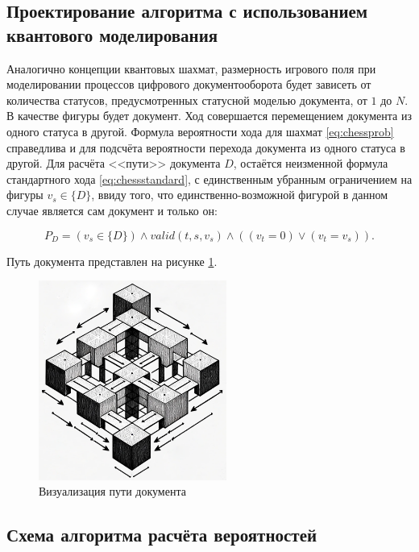 \subsection{Проектирование алгоритма с использованием квантового моделирования}

Аналогично концепции квантовых шахмат, размерность игрового поля при моделировании процессов цифрового документооборота будет зависеть от количества статусов, предусмотренных статусной моделью документа, от $1$ до $N$. В качестве фигуры будет документ. Ход совершается перемещением документа из одного статуса в другой. Формула вероятности хода для шахмат \ref{eq:chessprob} справедлива и для подсчёта вероятности перехода документа из одного статуса в другой. Для расчёта <<пути>> документа $D$, остаётся неизменной формула стандартного хода \ref{eq:chessstandard}, с единственным убранным ограничением на фигуры $v_s \in \{D\}$, ввиду того, что единственно-возможной фигурой в данном случае является сам документ и только он:

\begin{equation}\label{eq:docstandard}
	P_D = (v_s \in \{D\}) \wedge valid(t,s,v_s) \wedge ((v_t = 0) \vee (v_t = v_s)).
\end{equation}

Путь документа представлен на рисунке \ref{fig:doc2d}.

\begin{figure}[h!btp]
	\centering
	\includegraphics[width=0.55\textwidth]{inc/docv1.png}
	\caption{Визуализация пути документа}
	\label{fig:doc2d}
\end{figure}

\clearpage

\subsection{Схема алгоритма расчёта вероятностей}

